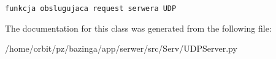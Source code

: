 \footnotesize\begin{verbatim}funkcja obslugujaca request serwera UDP

\end{verbatim}
\normalsize
 

The documentation for this class was generated from the following file:\begin{CompactItemize}
\item 
/home/orbit/pz/bazinga/app/serwer/src/Serv/UDPServer.py\end{CompactItemize}
